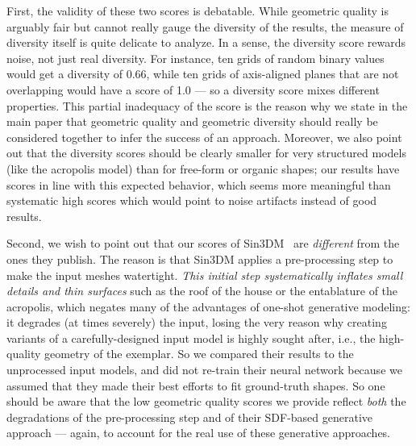 First, the validity of these two scores is debatable. While geometric quality is arguably fair but cannot really gauge the diversity of the results, the measure of diversity itself is quite delicate to analyze. In a sense, the diversity score rewards noise, not just real diversity. For instance, ten grids of random binary values would get a diversity of 0.66, while ten grids of axis-aligned planes that are not overlapping would have a score of 1.0 --- so a diversity score mixes different properties. This partial inadequacy of the score is the reason why we state in the main paper that geometric quality and geometric diversity should really be considered together to infer the success of an approach. Moreover, we also point out that the diversity scores should be clearly smaller for very structured models (like the acropolis model) than for free-form or organic shapes; our results have scores in line with this expected behavior, which seems more meaningful than systematic high scores which would point to noise artifacts instead of good results. 

Second, we wish to point out that our scores of Sin3DM~\cite{wu2024sindm} are \emph{different} from the ones they publish. The reason is that Sin3DM applies a pre-processing step to make the input meshes watertight. \emph{This initial step systematically inflates small details and thin surfaces} such as the roof of the house or the entablature of the acropolis, which negates many of the advantages of one-shot generative modeling: it degrades (at times severely) the input, losing the very reason why creating variants of a carefully-designed input model is highly sought after, i.e., the high-quality geometry of the exemplar. So we compared their results to the unprocessed input models, and did not re-train their neural network because we assumed that they made their best efforts to fit ground-truth shapes. So one should be aware that the low geometric quality scores we provide reflect \emph{both} the degradations of the pre-processing step and of their SDF-based generative approach --- again, to account for the real use of these generative approaches. 

